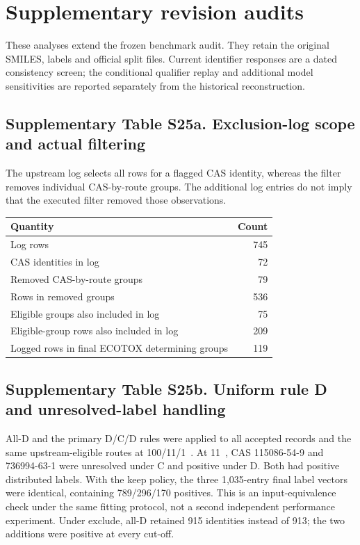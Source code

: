 \section*{Supplementary revision audits}

These analyses extend the frozen benchmark audit. They retain the original
SMILES, labels and official split files. Current identifier responses are a dated
consistency screen; the conditional qualifier replay and additional model
sensitivities are reported separately from the historical reconstruction.

\subsection*{Supplementary Table S25a. Exclusion-log scope and actual filtering}

The upstream log selects all rows for a flagged CAS identity, whereas
the filter removes individual CAS-by-route groups. The additional log entries
do not imply that the executed filter removed those observations.

\begin{center}
\small
\begin{tabular}{lr}
\toprule
Quantity & Count \\
\midrule
Log rows & 745 \\
CAS identities in log & 72 \\
Removed CAS-by-route groups & 79 \\
Rows in removed groups & 536 \\
Eligible groups also included in log & 75 \\
Eligible-group rows also included in log & 209 \\
Logged rows in final ECOTOX determining groups & 119 \\
\bottomrule
\end{tabular}
\end{center}

\subsection*{Supplementary Table S25b. Uniform rule D and unresolved-label handling}

All-D and the primary D/C/D rules were applied to all accepted records
and the same upstream-eligible routes at 100/11/1~\ugbee. At 11~\ugbee, CAS
115086-54-9 and 736994-63-1 were unresolved under C and positive under D. Both
had positive distributed labels. With the keep policy, the three 1,035-entry
final label vectors were identical, containing 789/296/170 positives. This is an
input-equivalence check under the same fitting protocol, not a second independent
performance experiment. Under exclude, all-D retained 915 identities instead of
913; the two additions were positive at every cut-off.

